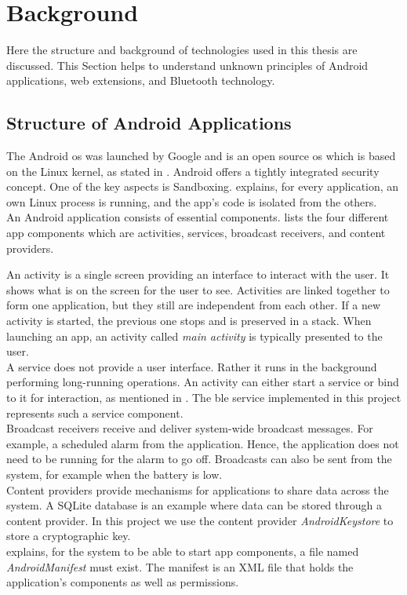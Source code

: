 \section{Background} \label{background}
Here the structure and background of technologies used in this thesis are discussed. This Section helps to understand unknown principles of Android applications, web extensions, and Bluetooth technology.

\subsection{Structure of Android Applications}
The Android \gls{os} was launched by Google and is an open source \gls{os} which is based on the Linux kernel, as stated in \cite{liu2011research}. Android offers a tightly integrated security concept. One of the key aspects is Sandboxing. \cite{AndroidFundamentals} explains, for every application, an own Linux process is running, and the app's code is isolated from the others. \\
An Android application consists of essential components.  \cite{liu2011research} lists the four different app components which are activities, services, broadcast receivers, and content providers.

An activity is a single screen providing an interface to interact with the user. It shows what is on the screen for the user to see. Activities are linked together to form one application, but they still are independent from each other. If a new activity is started, the previous one stops and is preserved in a stack. When launching an app, an activity called \textit{main activity} is typically presented to the user. \\
A service does not provide a user interface. Rather it runs in the background performing long-running operations. An activity can either start a service or bind to it for interaction, as mentioned in \cite{AndroidFundamentals}. The \gls{ble} service implemented in this project represents such a service component. \\
Broadcast receivers receive and deliver system-wide broadcast messages. For example, a scheduled alarm from the application. Hence, the application does not need to be running for the alarm to go off. Broadcasts can also be sent from the system, for example when the battery is low. \\
Content providers provide mechanisms for applications to share data across the system. A SQLite database is an example where data can be stored through a content provider. In this project we use the content provider \textit{AndroidKeystore} to store a cryptographic key. \\
\cite{AndroidFundamentals} explains, for the system to be able to start app components, a file named \textit{AndroidManifest} must exist. The manifest is an XML file that holds the application's components as well as permissions.


